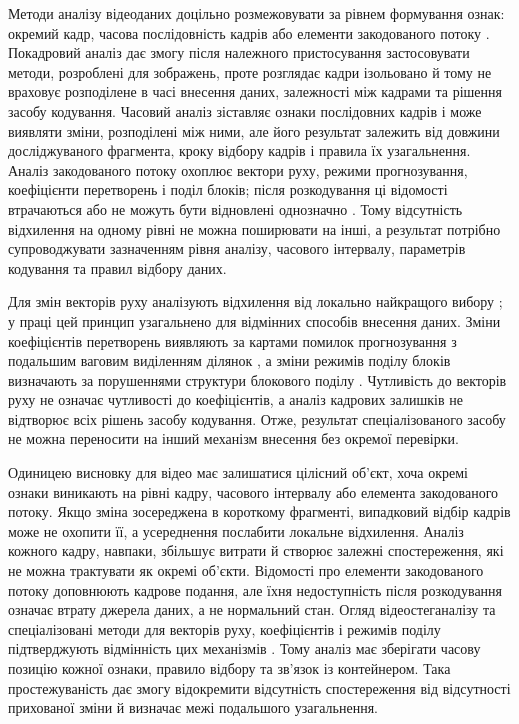 Методи аналізу відеоданих доцільно розмежовувати за рівнем формування ознак: окремий кадр, часова послідовність кадрів або елементи закодованого потоку \cite{bouzegza2022video}. Покадровий аналіз дає змогу після належного пристосування застосовувати методи, розроблені для зображень, проте розглядає кадри ізольовано й тому не враховує розподілене в часі внесення даних, залежності між кадрами та рішення засобу кодування. Часовий аналіз зіставляє ознаки послідовних кадрів і може виявляти зміни, розподілені між ними, але його результат залежить від довжини досліджуваного фрагмента, кроку відбору кадрів і правила їх узагальнення. Аналіз закодованого потоку охоплює вектори руху, режими прогнозування, коефіцієнти перетворень і поділ блоків; після розкодування ці відомості втрачаються або не можуть бути відновлені однозначно \cite{liu2021hevclocaloptimality,dai2025centralized,cao2026hevcpartition}. Тому відсутність відхилення на одному рівні не можна поширювати на інші, а результат потрібно супроводжувати зазначенням рівня аналізу, часового інтервалу, параметрів кодування та правил відбору даних.

Для змін векторів руху аналізують відхилення від локально найкращого вибору \cite{liu2021hevclocaloptimality}; у праці \cite{zhai2025generalized} цей принцип узагальнено для відмінних способів внесення даних. Зміни коефіцієнтів перетворень виявляють за картами помилок прогнозування з подальшим ваговим виділенням ділянок \cite{dai2025centralized}, а зміни режимів поділу блоків визначають за порушеннями структури блокового поділу \cite{cao2026hevcpartition}. Чутливість до векторів руху не означає чутливості до коефіцієнтів, а аналіз кадрових залишків не відтворює всіх рішень засобу кодування. Отже, результат спеціалізованого засобу не можна переносити на інший механізм внесення без окремої перевірки.

Одиницею висновку для відео має залишатися цілісний об’єкт, хоча окремі ознаки виникають на рівні кадру, часового інтервалу або елемента закодованого потоку. Якщо зміна зосереджена в короткому фрагменті, випадковий відбір кадрів може не охопити її, а усереднення послабити локальне відхилення. Аналіз кожного кадру, навпаки, збільшує витрати й створює залежні спостереження, які не можна трактувати як окремі об’єкти. Відомості про елементи закодованого потоку доповнюють кадрове подання, але їхня недоступність після розкодування означає втрату джерела даних, а не нормальний стан. Огляд відеостеганалізу та спеціалізовані методи для векторів руху, коефіцієнтів і режимів поділу підтверджують відмінність цих механізмів \cite{bouzegza2022video,liu2021hevclocaloptimality,dai2025centralized,cao2026hevcpartition}. Тому аналіз має зберігати часову позицію кожної ознаки, правило відбору та зв’язок із контейнером. Така простежуваність дає змогу відокремити відсутність спостереження від відсутності прихованої зміни й визначає межі подальшого узагальнення.

